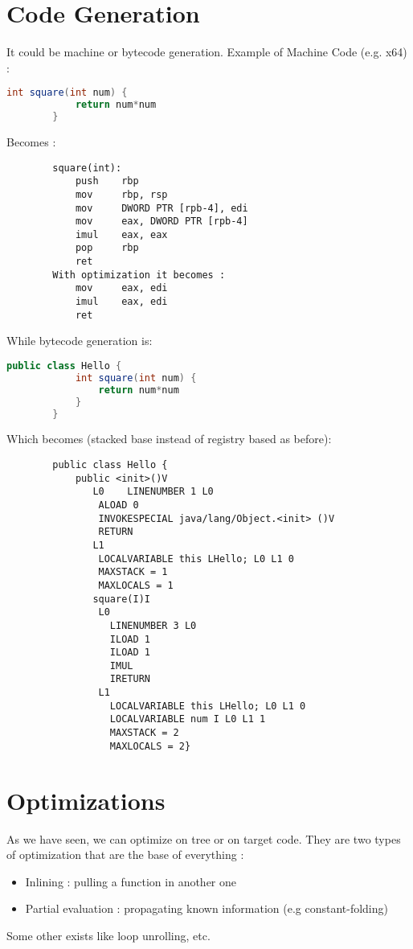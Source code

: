\section{Code Generation}
    It could be machine or bytecode generation.
    Example of Machine Code (e.g. x64) :
    \begin{lstlisting}[language=Java]
        int square(int num) {
            return num*num
        }
    \end{lstlisting}
    Becomes : 
    \begin{lstlisting}
        square(int):
            push    rbp
            mov     rbp, rsp
            mov     DWORD PTR [rpb-4], edi
            mov     eax, DWORD PTR [rpb-4]
            imul    eax, eax
            pop     rbp
            ret
        With optimization it becomes : 
            mov     eax, edi
            imul    eax, edi
            ret
    \end{lstlisting}

    While bytecode generation is:
    \begin{lstlisting}[language=Java]
        public class Hello {
            int square(int num) {
                return num*num
            }
        }
    \end{lstlisting}
    Which becomes (stacked base instead of registry based as before): 
    \begin{lstlisting}
        public class Hello {  
            public <init>()V
               L0    LINENUMBER 1 L0
                ALOAD 0    
                INVOKESPECIAL java/lang/Object.<init> ()V
                RETURN
               L1
                LOCALVARIABLE this LHello; L0 L1 0
                MAXSTACK = 1
                MAXLOCALS = 1
               square(I)I
                L0
                  LINENUMBER 3 L0
                  ILOAD 1
                  ILOAD 1
                  IMUL
                  IRETURN
                L1
                  LOCALVARIABLE this LHello; L0 L1 0
                  LOCALVARIABLE num I L0 L1 1
                  MAXSTACK = 2
                  MAXLOCALS = 2}
    \end{lstlisting}

    \section{Optimizations}
        As we have seen, we can optimize on tree or on target code. They are two
        types of optimization that are the base of everything : 
        \begin{itemize}
            \item Inlining : pulling a function in another one
            \item Partial evaluation : propagating known information (e.g constant-folding)
        \end{itemize}
        Some other exists like loop unrolling, etc.
